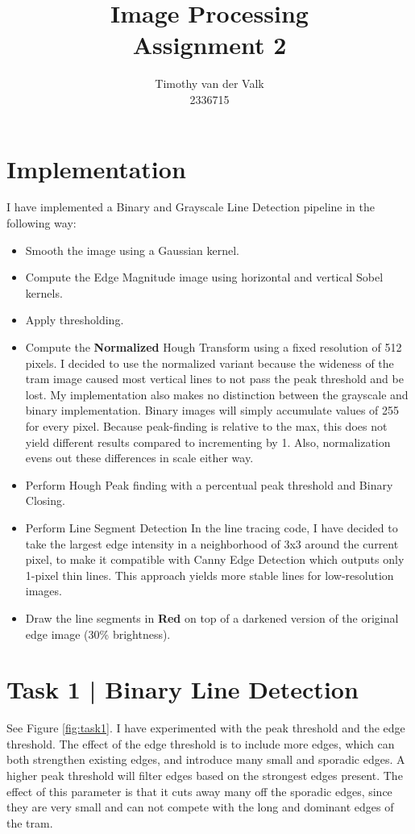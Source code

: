 \documentclass[10pt, a4paper]{article}
\title{Image Processing\\Assignment 2}
\author{Timothy van der Valk\\2336715}
\begin{document}
\maketitle

\section*{Implementation} %

I have implemented a Binary and Grayscale Line Detection pipeline in the following way:

\begin{itemize}
	\item Smooth the image using a Gaussian kernel.
	\item Compute the Edge Magnitude image using horizontal and vertical Sobel kernels.
	\item Apply thresholding.
	\item Compute the \textbf{Normalized} Hough Transform using a fixed resolution of 512 pixels.
		I decided to use the normalized variant because the wideness of the tram image caused
		most vertical lines to not pass the peak threshold and be lost. My implementation also
		makes no distinction between the grayscale and binary implementation. Binary images will simply
		accumulate values of 255 for every pixel. Because peak-finding is relative to the max, this does not yield
		different results compared to incrementing by 1. Also, normalization evens out these differences in scale either way.
	\item Perform Hough Peak finding with a percentual peak threshold and Binary Closing.
	\item Perform Line Segment Detection In the line tracing code, I have decided to take the largest edge
		intensity in a neighborhood of 3x3 around the current pixel, to make it compatible with
		Canny Edge Detection which outputs only 1-pixel thin lines. This approach yields more stable
		lines for low-resolution images.
	\item Draw the line segments in \textbf{Red} on top of a darkened version of the original edge image (30\% brightness).
\end{itemize}

\section*{Task 1 | Binary Line Detection} %

See Figure \ref{fig:task1}. I have experimented with the peak threshold and the edge threshold.
The effect of the edge threshold is to include more edges, which can both strengthen existing edges, and
introduce many small and sporadic edges. A higher peak threshold will filter edges based on the strongest edges present.
The effect of this parameter is that it cuts away many off the sporadic edges, since they are very small and can not compete
with the long and dominant edges of the tram.
\end{document}
